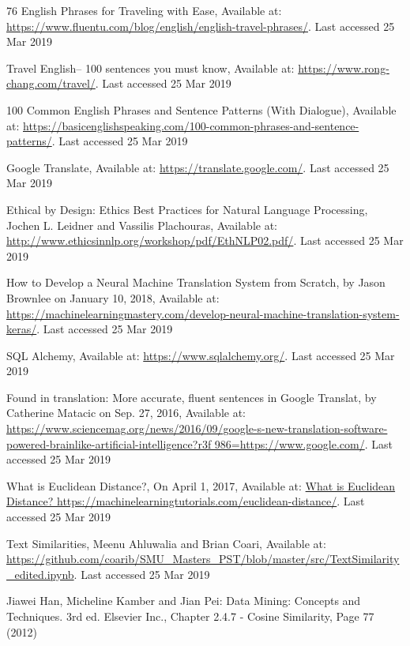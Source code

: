 \documentclass[runningheads]{llncs}
\begin{document}
\begin{thebibliography}{8}
	76 English Phrases for Traveling with Ease, Available at: \url{https://www.fluentu.com/blog/english/english-travel-phrases/}.  Last accessed 25 Mar 2019

	Travel English-- 100 sentences you must know, Available at: \url{https://www.rong-chang.com/travel/}.  Last accessed 25 Mar 2019

	100 Common English Phrases and Sentence Patterns (With Dialogue), Available at: \url{https://basicenglishspeaking.com/100-common-phrases-and-sentence-patterns/}.  Last accessed 25 Mar 2019

	Google Translate, Available at: \url{https://translate.google.com/}.  Last accessed 25 Mar 2019

	Ethical by Design: Ethics Best Practices for Natural Language Processing, Jochen L. Leidner and Vassilis Plachouras, Available at: \url{http://www.ethicsinnlp.org/workshop/pdf/EthNLP02.pdf/}.  Last accessed 25 Mar 2019

How to Develop a Neural Machine Translation System from Scratch, by Jason Brownlee on January 10, 2018, Available at: \url{https://machinelearningmastery.com/develop-neural-machine-translation-system-keras/}.  Last accessed 25 Mar 2019

SQL Alchemy, Available at: \url{https://www.sqlalchemy.org/}.  Last accessed 25 Mar 2019

Found in translation: More accurate, fluent sentences in Google Translat, by Catherine Matacic on Sep. 27, 2016,  Available at:  \url{https://www.sciencemag.org/news/2016/09/google-s-new-translation-software-powered-brainlike-artificial-intelligence?r3f 986=https://www.google.com/}.  Last accessed 25 Mar 2019

What is Euclidean Distance?, On April 1, 2017, Available at:  \url{What is Euclidean Distance?  https://machinelearningtutorials.com/euclidean-distance/}.  Last accessed 25 Mar 2019

Text Similarities, Meenu Ahluwalia and Brian Coari, Available at:  \url{https://github.com/coarib/SMU_Masters_PST/blob/master/src/TextSimilarity_edited.ipynb}.  Last accessed 25 Mar 2019

Jiawei Han, Micheline Kamber and Jian Pei: Data Mining: Concepts and Techniques. 3rd ed. Elsevier Inc., Chapter 2.4.7 - Cosine Similarity, Page 77 (2012)

\end{thebibliography}
\end{document}
